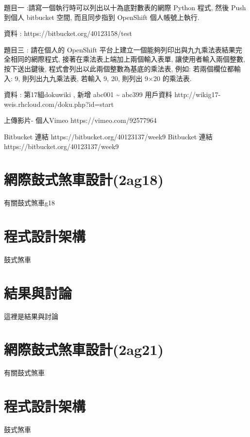\documentclass[]{article}
\begin{document}
題目一 :請寫一個執行時可以列出以十為底對數表的網際 Python 程式, 然後
Push 到個人 bitbucket 空間, 而且同步指到 OpenShift 個人帳號上執行.

資料 : https://bitbucket.org/40123158/test

題目三 : 請在個人的 OpenShift
平台上建立一個能夠列印出與九九乘法表結果完全相同的網際程式,
接著在乘法表上端加上兩個輸入表單, 讓使用者輸入兩個整數, 按下送出鍵後,
程式會列出以此兩個整數為基底的乘法表, 例如: 若兩個欄位都輸入: 9,
則列出九九乘法表, 若輸入 9, 20, 則列出 9×20 的乘法表.

資料 : 第17組dokuwiki , 新增 abc001 \textasciitilde{} abc399 用戶資料
http://wikig17-weis.rhcloud.com/doku.php?id=start

上傳影片- 個人Vimeo https://vimeo.com/92577964

Bitbucket 連結 https://bitbucket.org/40123137/week9 Bitbucket 連結
https://bitbucket.org/40123137/week9

\section{網際鼓式煞車設計(2ag18)}\label{ux7db2ux969bux9f13ux5f0fux715eux8ecaux8a2dux8a082ag18}

有關鼓式煞車g18

\section{程式設計架構}\label{ux7a0bux5f0fux8a2dux8a08ux67b6ux69cb-13}

鼓式煞車

\section{結果與討論}\label{ux7d50ux679cux8207ux8a0eux8ad6-13}

這裡是結果與討論

\section{網際鼓式煞車設計(2ag21)}\label{ux7db2ux969bux9f13ux5f0fux715eux8ecaux8a2dux8a082ag21}

有關鼓式煞車

\section{程式設計架構}\label{ux7a0bux5f0fux8a2dux8a08ux67b6ux69cb-14}

鼓式煞車
\end{document}
